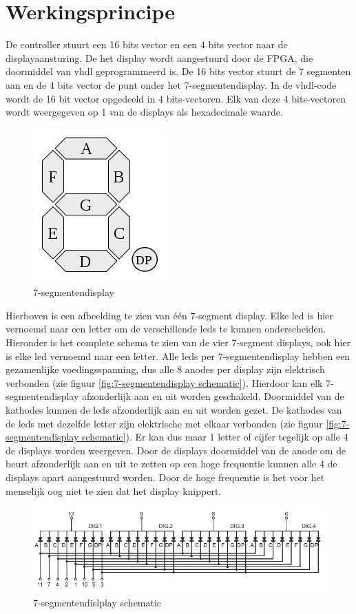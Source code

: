 \documentclass{report}
\begin{document}
\section{Werkingsprincipe}
De controller stuurt een 16 bits vector en een 4 bits vector naar de displayaansturing. De het display wordt aangestuurd door de FPGA, die doormiddel van vhdl geprogrammeerd is. De 16 bits vector stuurt de 7 segmenten aan en de 4 bits vector de punt onder het 7-segmentendisplay. In de vhdl-code wordt de 16 bit vector opgedeeld in 4 bits-vectoren. Elk van deze 4 bits-vectoren wordt weergegeven op 1 van de displays als hexadecimale waarde.
\begin{figure}[H]
\centering
\includegraphics{7_segment_display.png}

\caption{7-segmentendisplay}
\end{figure}
Hierboven is een afbeelding te zien van \'{e}\'{e}n 7-segment display. Elke led is hier vernoemd naar een letter om de verschillende leds te kunnen onderscheiden. Hieronder is het complete schema te zien van de vier 7-segment displays, ook hier is elke led vernoemd naar een letter. 
Alle leds per 7-segmentendisplay hebben een gezamenlijke voedingsspanning, dus alle 8 anodes per display zijn elektrisch verbonden (zie figuur \ref{fig:7-segmentendisplay schematic}). Hierdoor kan elk 7-segmentendisplay afzonderlijk aan en uit worden geschakeld. Doormiddel van de kathodes kunnen de leds afzonderlijk aan en uit worden gezet. De kathodes van de leds met dezelfde letter zijn elektrische met elkaar verbonden (zie figuur \ref{fig:7-segmentendisplay schematic}). Er kan dus maar 1 letter of cijfer tegelijk op alle 4 de displays worden weergeven. Door de displays doormiddel van de anode om de beurt afzonderlijk aan en uit te zetten op een hoge frequentie kunnen alle 4 de displays apart aangestuurd worden. Door de hoge frequentie is het voor het menselijk oog niet te zien dat het display knippert.
\begin{figure}[H]
\centering
\includegraphics{7_segment_display_schematic.png}

\caption{7-segmentendislplay schematic}
\end{figure}
\end{document}
